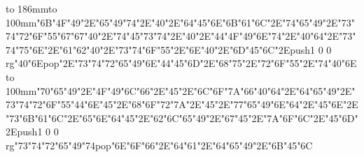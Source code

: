 \hbox to 186mm{\hsize=81mm\vbox to 100mm{\vfill\ipa\char"6B\ipa\char"4F\ipa\char"49\ipa\char"2E\ipa\char"65\ipa\char"49\ipa\char"74\ipa\char"2E\ipa\char"40\ipa\char"2E\ipa\char"64\ipa\char"45\ipa\char"6E\medskip\ipa\char"6B\ipa\char"61\ipa\char"6C\ipa\char"2E\ipa\char"74\ipa\char"65\ipa\char"49\ipa\char"2E\ipa\char"73\ipa\char"74\ipa\char"72\ipa\char"6F\ipa\char"55\ipa\char"67\medskip\ipa\char"67\ipa\char"40\ipa\char"2E\ipa\char"74\ipa\char"45\ipa\char"73\ipa\char"74\ipa\char"2E\ipa\char"40\ipa\char"2E\ipa\char"44\ipa\char"4F\ipa\char"49\ipa\char"6E\ipa\char"74\ipa\char"2E\ipa\char"40\ipa\char"64\ipa\char"2E\ipa\char"73\ipa\char"74\ipa\char"75\ipa\char"6E\ipa\char"2E\ipa\char"61\ipa\char"62\medskip\ipa\char"40\ipa\char"2E\ipa\char"73\ipa\char"74\ipa\char"6F\ipa\char"55\ipa\char"2E\ipa\char"6E\ipa\char"40\ipa\char"2E\ipa\char"6D\ipa\char"45\ipa\char"6C\ipa\char"2E\pdfcolorstack\match push{1 0 0 rg}\ipa\char"40\ipa\char"6E\pdfcolorstack\match pop{}\ipa\char"2E\ipa\char"73\ipa\char"74\ipa\char"72\ipa\char"65\ipa\char"49\ipa\char"6E\medskip\ipa\char"44\ipa\char"45\ipa\char"6D\ipa\char"2E\ipa\char"68\ipa\char"75\ipa\char"2E\ipa\char"72\ipa\char"6F\ipa\char"55\ipa\char"2E\ipa\char"74\ipa\char"40\ipa\char"6E\vfill}\hfill\vbox to 100mm{\vfill\ipa\char"70\ipa\char"65\ipa\char"49\ipa\char"2E\ipa\char"4F\ipa\char"49\ipa\char"6C\ipa\char"66\ipa\char"2E\ipa\char"45\ipa\char"2E\ipa\char"6C\ipa\char"6F\ipa\char"7A\medskip\ipa\char"66\ipa\char"40\ipa\char"64\ipa\char"2E\ipa\char"64\ipa\char"65\ipa\char"49\ipa\char"2E\ipa\char"73\ipa\char"74\ipa\char"72\ipa\char"6F\ipa\char"55\ipa\char"44\medskip\ipa\char"6E\ipa\char"45\ipa\char"2E\ipa\char"68\ipa\char"6F\ipa\char"72\ipa\char"7A\ipa\char"2E\ipa\char"45\ipa\char"2E\ipa\char"77\ipa\char"65\ipa\char"49\ipa\char"6E\ipa\char"64\ipa\char"2E\ipa\char"45\ipa\char"6E\ipa\char"2E\ipa\char"73\ipa\char"6B\ipa\char"61\ipa\char"6C\ipa\char"2E\ipa\char"65\ipa\char"6E\ipa\char"64\medskip\ipa\char"45\ipa\char"2E\ipa\char"62\ipa\char"6C\ipa\char"65\ipa\char"49\ipa\char"2E\ipa\char"67\ipa\char"45\ipa\char"2E\ipa\char"7A\ipa\char"6F\ipa\char"6C\ipa\char"2E\ipa\char"45\ipa\char"6D\ipa\char"2E\pdfcolorstack\match push{1 0 0 rg}\ipa\char"73\ipa\char"74\ipa\char"72\ipa\char"65\ipa\char"49\ipa\char"74\pdfcolorstack\match pop{}\medskip\ipa\char"6E\ipa\char"6F\ipa\char"66\ipa\char"2E\ipa\char"64\ipa\char"61\ipa\char"2E\ipa\char"64\ipa\char"65\ipa\char"49\ipa\char"2E\ipa\char"6B\ipa\char"45\ipa\char"6C\vfill}}\eject
